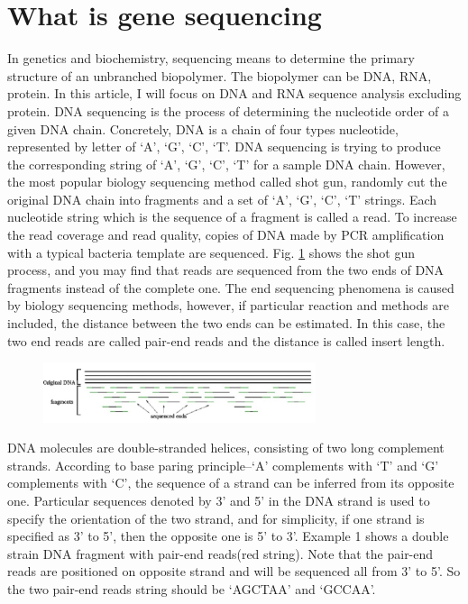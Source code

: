 \documentclass{article}
\begin{document}
\section{What is gene sequencing}
In genetics and biochemistry, sequencing means to determine the primary structure of an unbranched biopolymer. The biopolymer can be DNA, RNA, protein. In this article, I will focus on DNA and RNA sequence analysis excluding protein. DNA sequencing is the process of determining the nucleotide order of a given DNA chain. Concretely, DNA is a chain of four types nucleotide, represented by letter of `A', `G', `C', `T'. DNA sequencing is trying to produce the corresponding string of `A', `G', `C', `T' for a sample DNA chain. However, the most popular biology sequencing method called shot gun, randomly cut the original DNA chain into fragments and a set of `A', `G', `C', `T' strings. Each nucleotide string which is the sequence of a fragment is called a read. To increase the read coverage and read quality, copies of DNA made by PCR amplification with a typical bacteria template are sequenced. Fig. \ref{shot_gun_method} shows the shot gun process, and you may find that reads are sequenced from the two ends of DNA fragments instead of the complete one. The end sequencing phenomena is caused by biology sequencing methods, however, if particular reaction and methods are included, the distance between the two ends can be estimated. In this case, the two end reads are called pair-end reads and the distance is called insert length.\\
\begin{figure}[ht]
  \centering
  \includegraphics[width=8cm]{Figure1.jpg}\\
  \caption{}\label{shot_gun_method}
\end{figure}
DNA molecules are double-stranded helices, consisting of two long complement strands. According to base paring principle--`A' complements with `T' and `G' complements with `C', the sequence of a strand can be inferred from its opposite one. Particular sequences denoted by 3' and 5' in the DNA strand is used to specify the orientation of the two strand, and for simplicity, if one strand is specified as 3' to 5', then the opposite one is 5' to 3'. Example 1 shows a double strain DNA fragment with pair-end reads(red string). Note that the pair-end reads are positioned on opposite strand and will be sequenced all from 3' to 5'. So the two pair-end reads string should be `AGCTAA' and `GCCAA'.
\end{document}

